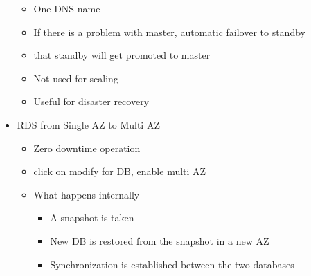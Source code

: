 \documentclass[]{scrartcl}
\begin{document}
\begin{itemize}
\begin{itemize}
		\item One DNS name
		\item If there is a problem with master, automatic failover to standby
		\item that standby will get promoted to master
		\item Not used for scaling
		\item Useful for disaster recovery
	\end{itemize}
	\item RDS from Single AZ to Multi AZ
	\begin{itemize}
		\item Zero downtime operation
		\item click on modify for DB, enable multi AZ
		\item What happens internally
		\begin{itemize}
			\item A snapshot is taken
			\item New DB is restored from the snapshot in a new AZ
			\item Synchronization is established between the two databases
		\end{itemize}
	\end{itemize}
\end{itemize}
\end{document}
